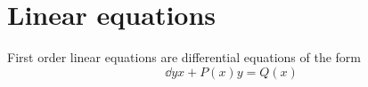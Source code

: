 \documentclass{book}
\begin{document}






\newpage
\section{Linear equations}

First order linear equations are differential equations of the form
\begin{equation}
  \label{eq:linear}
  \dd{y}{x} + P(x) y = Q(x)
\end{equation}
\end{document}

